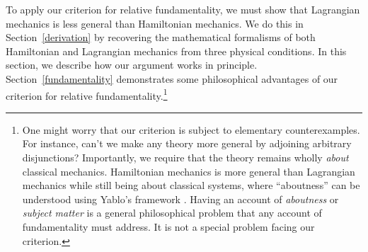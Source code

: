 \documentclass[12pt, twoside]{article}
\begin{document}
To apply our criterion for relative fundamentality, we must show that Lagrangian mechanics is less general than Hamiltonian mechanics. We do this in Section~\ref{derivation} by recovering the mathematical formalisms of both Hamiltonian and Lagrangian mechanics from three physical conditions. In this section, we describe how our argument works in principle. Section~\ref{fundamentality} demonstrates some philosophical advantages of our criterion for relative fundamentality.\footnote{One might worry that our criterion is subject to elementary counterexamples. For instance, can't we make any theory more general by adjoining arbitrary disjunctions? Importantly, we require that the theory remains wholly \textit{about} classical mechanics. Hamiltonian mechanics is more general than Lagrangian mechanics while still being about classical systems, where ``aboutness'' can be understood using Yablo's framework \parencites*[]{Yablo}. Having an account of \textit{aboutness} or \textit{subject matter} is a general philosophical problem that any account of fundamentality must address. It is not a special problem facing our criterion.} 


\end{document}
